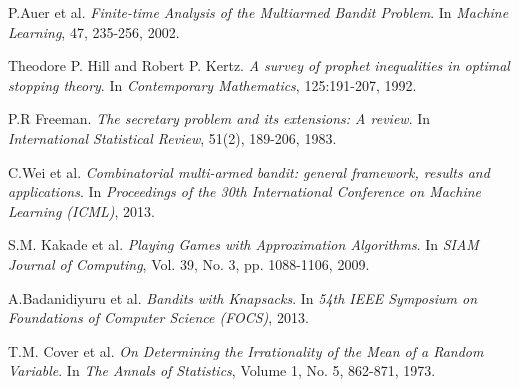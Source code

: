 \documentclass[bachelor]{thuthesis}
\begin{document}
%
%



\begin{thebibliography}{1}

P.Auer et al. \emph{Finite-time Analysis of the Multiarmed Bandit Problem}.
In \emph{Machine Learning}, 47, 235-256, 2002.

Theodore P. Hill and Robert P. Kertz. \emph{A survey of prophet inequalities in optimal stopping theory}.
In \emph{Contemporary Mathematics}, 125:191-207, 1992.

P.R Freeman. \emph{The secretary problem and its extensions: A review}.
In \emph{International Statistical Review}, 51(2), 189-206, 1983.

C.Wei et al. \emph{Combinatorial multi-armed bandit: general framework, results and applications}.
In \emph{Proceedings of the 30th International Conference on Machine Learning (ICML)}, 2013.

S.M. Kakade et al. \emph{Playing Games with Approximation Algorithms}.
In \emph{SIAM Journal of  Computing}, Vol. 39, No. 3, pp. 1088-1106, 2009.

A.Badanidiyuru et al. \emph{Bandits with Knapsacks}.
In \emph{54th IEEE Symposium on Foundations of Computer Science (FOCS)}, 2013.

T.M. Cover et al. \emph{On Determining the Irrationality of the Mean of a Random Variable}.
In \emph{The Annals of Statistics}, Volume 1, No. 5, 862-871, 1973.



\end{thebibliography}



\end{document}
